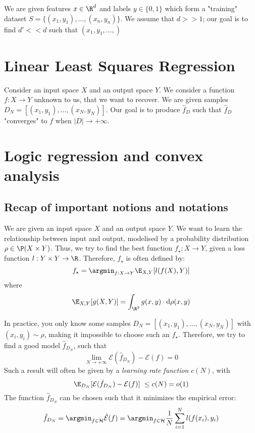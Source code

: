 \documentclass[toc]{../cs-classes/cs-classes}
\begin{document}
\begin{example}
    We are given features $x\in \R^d$ and labels $y\in\{0, 1\}$ which form a "training" dataset $S=\{(x_1, y_1), \dots, (x_n, y_n)\}$. We assume that $d>>1$; our goal is to find $d'<<d$ such that $(x_1, y_1, \dots, )$
\end{example}

\section{Linear Least Squares Regression}
Consider an input space $X$ and an output space $Y$. We consider a function $f:X\to Y$ unknown to us, that we want to recover. We are given samples $D_N = [(x_1, y_1), \dots, (x_N, y_N)]$. Our goal is to produce $\hat{f}_D$ such that $\hat{f}_D$ "converges" to $f$ when $|D|\to+\infty$.

\section{Logic regression and convex analysis}
\subsection*{Recap of important notions and notations}
We are given an input space $X$ and an output space $Y$. We want to learn the relationship between input and output, modelised by a probability distribution $\rho\in \P(X\times Y)$. Thus, we try to find the best function $f_\star:X\to Y$, given a loss function $l:Y\times Y\to\R$. Therefore, $f_\star$ is often defined by:
\begin{equation*}
    f_\star = \argmin_{f:X\to Y} \E_{X, Y}[l(f(X), Y)]
\end{equation*}
where
\begin{equation*}
    \E_{X, Y}[g(X, Y)] = \int_{\R^2} g(x, y) \cdot \mathrm{d}\rho(x, y)
\end{equation*}

In practice, you only know some samples $D_N=[(x_1, y_1), \dots, (x_N, y_N)]$ with $(x_i, y_i) \sim \rho$, making it impossible to choose such an $f_\star$. Therefore, we try to find a good model $\hat{f}_{D_N}$, such that
\begin{equation*}
    \lim_{N\to+\infty}\mathcal{E}(\hat{f}_{D_N}) - \mathcal{E}(f) = 0
\end{equation*}
Such a result will often be given by a \emph{learning rate function} $c(N)$, with
\begin{equation*}
    \E_{D_N}[\mathcal{E}(\hat{f}_{D_N}) - \mathcal{E}(f)] \leq c(N) = o(1)
\end{equation*}
The function $\hat{f}_{D_N}$ can be chosen such that it minimizes the empirical error:
\begin{equation*}
    \hat{f}_{D_N} = \argmin_{f\in\mathcal{H}}\hat{\mathcal{E}}(f) = \argmin_{f\in\mathcal{H}} \frac{1}{N} \sum_{i=1}^N l(f(x_i), y_i)
\end{equation*}
\end{document}
